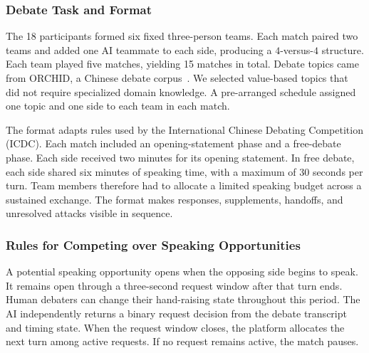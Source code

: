 \documentclass[manuscript,review,anonymous]{acmart}
\begin{document}
\subsubsection{Debate Task and Format}

The 18 participants formed six fixed three-person teams. Each match paired two teams and added one AI teammate to each side, producing a $4$-versus-$4$ structure. Each team played five matches, yielding 15 matches in total. Debate topics came from ORCHID, a Chinese debate corpus~\cite{zhao2023orchid}. We selected value-based topics that did not require specialized domain knowledge. A pre-arranged schedule assigned one topic and one side to each team in each match.

The format adapts rules used by the International Chinese Debating Competition (ICDC). Each match included an opening-statement phase and a free-debate phase. Each side received two minutes for its opening statement. In free debate, each side shared six minutes of speaking time, with a maximum of 30 seconds per turn. Team members therefore had to allocate a limited speaking budget across a sustained exchange. The format makes responses, supplements, handoffs, and unresolved attacks visible in sequence.

\subsubsection{Rules for Competing over Speaking Opportunities}

A potential speaking opportunity opens when the opposing side begins to speak. It remains open through a three-second request window after that turn ends. Human debaters can change their hand-raising state throughout this period. The AI independently returns a binary request decision from the debate transcript and timing state. When the request window closes, the platform allocates the next turn among active requests. If no request remains active, the match pauses.
\end{document}
